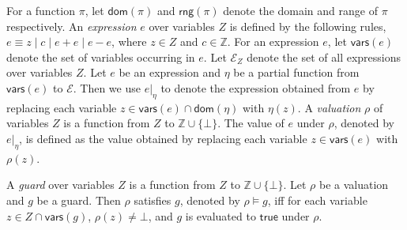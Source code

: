 \documentclass[runningheads,a4paper]{llncs}
\def\Ee{{\mathcal{E} }}
\newcommand\intnum{{\mathbb{Z} }}
\newcommand\vars{\mathsf{vars}}
\newcommand\dom{\mathsf{dom}}
\newcommand\rng{\mathsf{rng}}
\newcommand\ltrue{\mathsf{true}}
\newcommand{\sub}[2]{#1|_{#2}}
\begin{document}
For a function $\pi$, let $\dom(\pi)$ and $\rng(\pi)$ denote the domain  and range of $\pi$ respectively. 
An \emph{expression} $e$ over variables $Z$ is defined by the following rules, $e\equiv  z \mid c \mid e + e \mid e - e$, where $z \in Z$ and $c\in \intnum$. 
For an expression $e$, let $\vars(e)$ denote the set of variables occurring in $e$. Let $\Ee_Z$ denote the set of all expressions over variables $Z$. Let $e$ be an expression and $\eta$ be a partial function from $\vars(e)$ to $\Ee$. Then we use $\sub{e}{\eta}$ to denote the expression obtained from $e$ by replacing each variable $z \in \vars(e)\cap\dom(\eta)$ with $\eta(z)$. A \emph{valuation} $\rho$ of variables $Z$ is a function from $Z$ to $\intnum \cup \{\bot\}$. The value of $e$ under $\rho$, denoted by $\sub{e}{\eta}$, is defined as the value obtained by replacing each variable $z \in \vars(e)$ with $\rho(z)$.

A \emph{guard} over variables $Z$ is a function from $Z$ to $\intnum \cup \{\bot\}$. Let $\rho$ be a valuation and $g$ be a guard. Then $\rho$ satisfies $g$, denoted by $\rho \models g$, iff for each variable $z \in Z \cap \vars(g)$, $\rho(z) \neq \bot$, and $g$ is evaluated to $\ltrue$ under $\rho$. 
\end{document}

